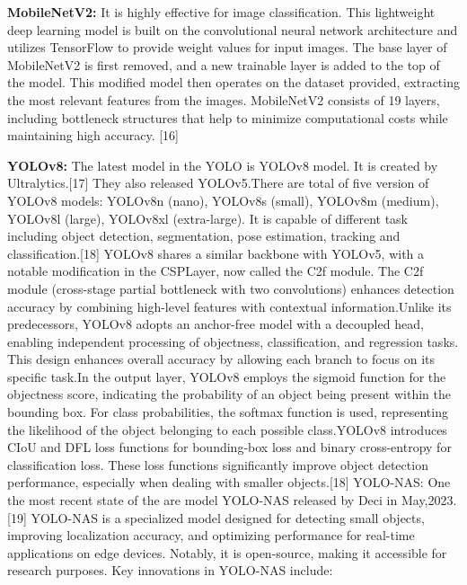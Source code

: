 \documentclass[conference]{IEEEtran}
\begin{document}
\textbf{MobileNetV2: }It is highly effective for image classification. This lightweight deep learning model is built on the convolutional neural network architecture and utilizes TensorFlow to provide weight values for input images. The base layer of MobileNetV2 is first removed, and a new trainable layer is added to the top of the model. This modified model then operates on the dataset provided, extracting the most relevant features from the images. MobileNetV2 consists of 19 layers, including bottleneck structures that help to minimize computational costs while maintaining high accuracy. [16] 

\textbf{YOLOv8:} The latest model in the YOLO is YOLOv8 model. It is created by Ultralytics.[17] They also released YOLOv5.There are total of five version of YOLOv8 models: YOLOv8n (nano), YOLOv8s (small), YOLOv8m (medium), YOLOv8l (large), YOLOv8xl (extra-large). It is capable of different task including object detection, segmentation, pose estimation, tracking and classification.[18] YOLOv8 shares a similar backbone with YOLOv5, with a notable modification in the CSPLayer, now called the C2f module. The C2f module (cross-stage partial bottleneck with two convolutions) enhances detection accuracy by combining high-level features with contextual information.Unlike its predecessors, YOLOv8 adopts an anchor-free model with a decoupled head, enabling independent processing of objectness, classification, and regression tasks. This design enhances overall accuracy by allowing each branch to focus on its specific task.In the output layer, YOLOv8 employs the sigmoid function for the objectness score, indicating the probability of an object being present within the bounding box. For class probabilities, the softmax function is used, representing the likelihood of the object belonging to each possible class.YOLOv8 introduces CIoU and DFL loss functions for bounding-box loss and binary cross-entropy for classification loss. These loss functions significantly improve object detection performance, especially when dealing with smaller objects.[18] YOLO-NAS: One the most recent state of the are model YOLO-NAS released by Deci in May,2023.[19] YOLO-NAS is a specialized model designed for detecting small objects, improving localization accuracy, and optimizing performance for real-time applications on edge devices. Notably, it is open-source, making it accessible for research purposes. Key innovations in YOLO-NAS include:\\
\end{document}
